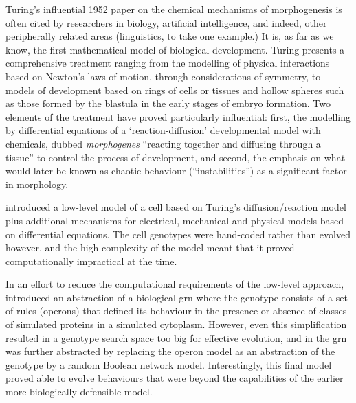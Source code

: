 Turing's influential 1952 paper \parencite{Turing:1952qr} on the chemical mechanisms of \gls{morphogenesis}
is often cited by researchers in biology, artificial intelligence, and indeed, other peripherally related areas
(linguistics, to take one example.) It is, as far as we know, the first mathematical model of biological development.
Turing presents a comprehensive treatment ranging from the modelling of physical interactions based on Newton's laws of
motion, through considerations of symmetry, to models of development based on rings of cells or tissues and hollow
spheres such as those formed by the blastula in the early stages of embryo formation. Two elements of the treatment have
proved particularly influential: first, the modelling by differential equations of a `reaction-diffusion' developmental
model with chemicals, dubbed \emph{morphogenes} ``reacting together and diffusing through a tissue''
\parencite{Turing:1952qr} to control the process of development, and second, the emphasis on what would later be known
as chaotic behaviour (``instabilities'') as a significant factor in morphology.

\cite{Fleischer:1994kx} introduced a low-level model of a cell based on Turing's diffusion/reaction model
\parencite{Turing:1952qr} plus additional mechanisms for electrical, mechanical and physical models based on
differential equations. The cell genotypes were hand-coded rather than evolved however, and the high complexity of the
model meant that it proved computationally impractical at the time.

In an effort to reduce the computational requirements of the low-level approach, \cite{Dellaert:1995po}
introduced an abstraction of a biological \gls{grn} where the genotype consists of a set of rules (operons) that defined
its behaviour in the presence or absence of classes of simulated proteins in a simulated cytoplasm. However, even this
simplification resulted in a genotype search space too big for effective evolution, and in \cite{Dellaert:1996ys} the
\gls{grn} was further abstracted by replacing the operon model as an abstraction of the genotype by a random Boolean
network model. Interestingly, this final model proved able to evolve behaviours that were beyond the capabilities of the
earlier more biologically defensible model.


